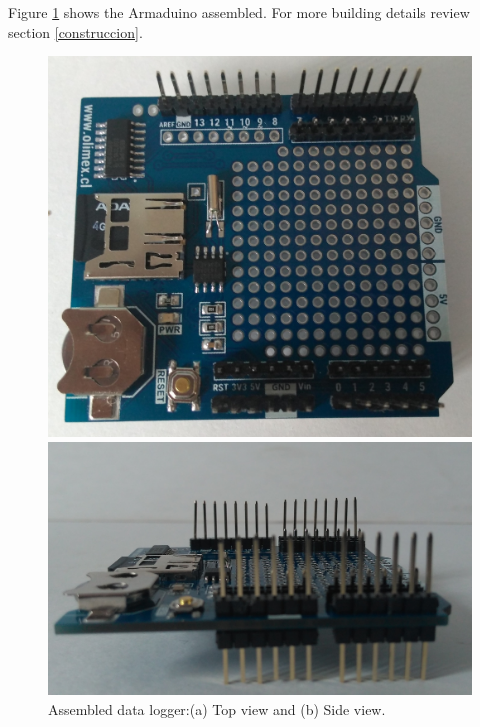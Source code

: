 \documentclass[12pt,letterpaper]{article}
\numberwithin{figure}{section}
\numberwithin{equation}{section}
\numberwithin{table}{section}
\begin{document}
Figure \ref{fig:16} shows the Armaduino assembled. For more building details review section \ref{construccion}.

\begin{figure}[H]
    \centering
    \begin{minipage}{.4\textwidth}
    \centering
    \includegraphics[width=\linewidth]{Figuras/figure_16_a.jpg}
    \end{minipage}
    \centering
    \begin{minipage}{.4\textwidth}
    \centering
    \includegraphics[width=\linewidth]{Figuras/figure_16_b.jpg}
    \end{minipage}
    
    \caption{Assembled data logger:(a) Top view and (b) Side view.}
    \label{fig:16}
\end{figure}
\end{document}
